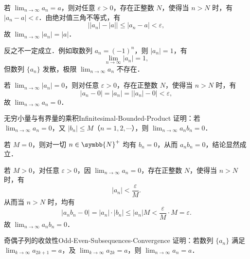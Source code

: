 \begin{myproof}
    若 $\lim_{n\to\infty} a_n = a$，则对任意 $\varepsilon > 0$，存在正整数 $N$，使得当 $n > N$ 时，有 $|a_n - a| < \varepsilon$．由绝对值三角不等式，有
    \begin{equation}
        \bigl| |a_n| - |a| \bigr| \leqslant |a_n - a| < \varepsilon,
    \end{equation}
    故 $\lim_{n\to\infty} |a_n| = |a|$．

    反之不一定成立．例如取数列 $a_n = (-1)^n$，则 $|a_n| = 1$，有
    \begin{equation}
        \lim_{n\to\infty} |a_n| = 1,
    \end{equation}
    但数列 $\{a_n\}$ 发散，极限 $\lim_{n\to\infty} a_n$ 不存在．

    若 $\lim_{n\to\infty} |a_n| = 0$，则对任意 $\varepsilon > 0$，存在正整数 $N$，使得当 $n > N$ 时，有
    \begin{equation}
        |a_n - 0| = |a_n| = \bigl| |a_n| - 0 \bigr| < \varepsilon,
    \end{equation}
    故 $\lim_{n\to\infty} a_n = 0$．
\end{myproof}

\begin{problem}{无穷小量与有界量的乘积}{Infinitesimal-Bounded-Product}
    证明：若 $\lim_{n\to\infty} a_n = 0$，又 $|b_n| \leqslant M$（$n = 1, 2, \cdots$），则 $\lim_{n\to\infty} a_n b_n = 0$．
\end{problem}

\begin{myproof}
    若 $M = 0$，则对一切 $n \in \symbb{N}^+$ 均有 $b_n = 0$，从而 $a_n b_n = 0$，结论显然成立．

    若 $M > 0$，对任意 $\varepsilon > 0$，因 $\lim_{n\to\infty} a_n = 0$，存在正整数 $N$，使得当 $n > N$ 时，有
    \begin{equation}
        |a_n| < \frac{\varepsilon}{M}.
    \end{equation}
    从而当 $n > N$ 时，均有
    \begin{equation}
        |a_n b_n - 0| = |a_n| \cdot |b_n| \leqslant |a_n| M < \frac{\varepsilon}{M} \cdot M = \varepsilon.
    \end{equation}
    故 $\lim_{n\to\infty} a_n b_n = 0$．
\end{myproof}

\begin{problem}{奇偶子列的收敛性}{Odd-Even-Subsequences-Convergence}
    证明：若数列 $\{a_n\}$ 满足 $\lim_{k\to\infty} a_{2k+1} = a$，及 $\lim_{k\to\infty} a_{2k} = a$，则 $\lim_{n\to\infty} a_n = a$．
\end{problem}

